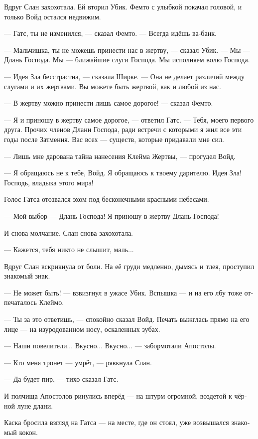 \documentclass[a4paper,12pt,fleqn]{book}\usepackage{polyglossia}\setdefaultlanguage[babelshorthands=true]{russian}\setotherlanguage{english}\defaultfontfeatures{Ligatures=TeX,Mapping=tex-text}\usepackage{xcolor}\newcommand{\ml}[3]{#2}
\begin{document}
Вдруг Слан захохотала.
Ей вторил Убик.
Фемто с улыбкой покачал головой, и только Войд остался недвижим.

--- Гатс, ты не изменился, --- сказал Фемто.
--- Всегда идёшь ва-банк.

--- Мальчишка, ты не можешь принести нас в жертву, --- сказал Убик.
--- Мы --- Длань Господа.
Мы --- ближайшие слуги Господа.
Мы исполняем волю Господа.

--- Идея Зла бесстрастна, --- сказала Ширке.
--- Она не делает различий между слугами и их жертвами.
Вы можете быть жертвой, как и любой из нас.

--- В жертву можно принести лишь самое дорогое! --- сказал Фемто.

--- Я и приношу в жертву самое дорогое, --- ответил Гатс.
--- Тебя, моего первого друга.
Прочих членов Длани Господа, ради встречи с которыми я жил все эти годы после Затмения.
Вас всех --- существ, которые придавали мне сил.

--- Лишь мне дарована тайна нанесения Клейма Жертвы, --- прогудел Войд.

--- Я обращаюсь не к тебе, Войд.
Я обращаюсь к твоему дарителю.
Идея Зла!
Господь, владыка этого мира!

Голос Гатса отозвался эхом под бесконечными красными небесами.

--- Мой выбор --- Длань Господа!
Я приношу в жертву Длань Господа!

И снова молчание.
Слан снова захохотала.

--- Кажется, тебя никто не слышит, маль...

Вдруг Слан вскрикнула от боли.
На её груди медленно, дымясь и тлея, проступил знакомый знак.

--- Не может быть! --- взвизгнул в ужасе Убик.
Вспышка --- и на его лбу тоже отпечаталось Клеймо.

--- Ты за это ответишь, --- спокойно сказал Войд.
Печать выжглась прямо на его лице --- на изуродованном носу, оскаленных зубах.

--- Наши повелители...
Вкусно...
Вкусно... --- забормотали Апостолы.

--- Кто меня тронет --- умрёт, --- рявкнула Слан.

--- Да будет пир, --- тихо сказал Гатс.

И полчища Апостолов ринулись вперёд --- на штурм огромной, воздетой к чёрной луне длани.

Каска бросила взгляд на Гатса --- на месте, где он стоял, уже возвышался знакомый кокон.
\end{document}
